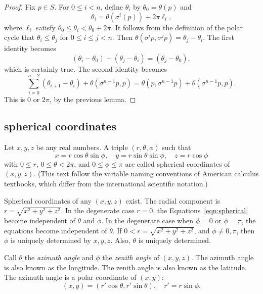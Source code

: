 \begin{proof}
Fix $p\in S$.
For $0\le i<n$, define $\theta_i$ by
   $\theta_0=\theta(p)$ and 
   $$\theta_i = \theta(\sigma^i(p)) + 2\pi \ell_i,$$
where  $\ell_i$ satisfy $\theta_0\le \theta_i < \theta_0+2\pi$.
It follows from the definition of the polar cycle that
$\theta_i \le \theta_j$ for $0\le i\le j < n$.  Then
$\theta(\sigma^i p ,\sigma^j p) = \theta_j - \theta_i$.
The first identity becomes
  $$
  (\theta_i-\theta_0) + (\theta_j-\theta_i) = (\theta_j-\theta_0),
  $$
which is certainly true.
The second identity becomes
  $$
  \sum_{i=0}^{n-2} (\theta_{i+1}-\theta_i) + \theta(\sigma^{n-1}p,p)
  = \theta(p,\sigma^{n-1}p) + \theta(\sigma^{n-1}p,p).
  $$
This is $0$ or $2\pi$, by the previous lemma.
\end{proof}

\subsection{spherical coordinates}
\label{sec:spherical}



\begin{definition}
Let $x,y,z$ be any real numbers.  A
triple $(r,\theta,\phi)$ such that
    \begin{equation}
    \label{eqn:spherical}
    x = r\cos\theta\sin\phi,\quad y = r\sin\theta\sin\phi,\quad
    z = r\cos\phi
    \end{equation}
with $0\le r$, $0\le\theta<2\pi$, and $0\le\phi\le\pi$ are called
spherical coordinates of $(x,y,z)$.  (This text follow the variable
naming conventions of American calculus textbooks, which differ
from the international scientific notation.)
\end{definition}

Spherical coordinates of any $(x,y,z)$ exist.
The radial component is $r = \sqrt{x^2+y^2+z^2}$.  In the degenerate case $r=0$,
the Equations~\ref{eqn:spherical} become independent of $\theta$
and $\phi$. In the degenerate case when $\phi = 0$ or $\phi =
\pi$, the equations become independent of $\theta$. If $0<r =
\sqrt{x^2+y^2+z^2}$, and $\phi\ne 0,\pi$,  then $\phi$ is uniquely
determined by $x,y,z$. Also, $\theta$ is uniquely determined.


Call $\theta$ the {\it azimuth angle\/} and $\phi$ the {\it
zenith angle\/} of $(x,y,z)$.  The azimuth angle is also known as
the longitude.  The zenith angle is also known as the latitude. The
azimuth angle is a polar coordinate of $(x,y)$:
    $$
    (x,y) = (r'\cos\theta,r'\sin\theta), \quad r' = r\sin\phi.
    $$


